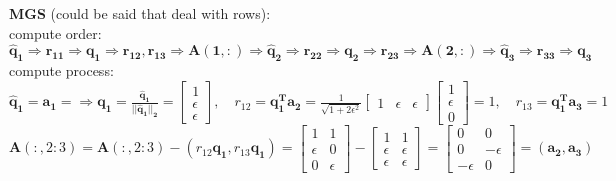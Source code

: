 \documentclass[english,onecolumn]{IEEEtran}
\begin{document}
\begin{enumerate}
    \textbf{MGS} (could be said that deal with rows):\\
    compute order:$\mathbf{ \hat{q}_1 \Rightarrow r_{11} \Rightarrow q_1 \Rightarrow r_{12},r_{13} \Rightarrow A(1,:) \Rightarrow \hat{q}_2 \Rightarrow r_{22} \Rightarrow q_2 \Rightarrow r_{23} \Rightarrow A(2,:) \Rightarrow \hat{q}_3  \Rightarrow r_{33} \Rightarrow q_3 }$\\
    compute process:\\
    $\mathbf{\hat{q}_1 = a_1} =  \Rightarrow
    \mathbf{q_1 = \frac{\hat{q}_1}{||\hat{q}_1||_2}} = 
    \begin{bmatrix}
    1 \\ \epsilon \\ \epsilon 
    \end{bmatrix}, \quad
    r_{12} = \mathbf{q_1^T a_2}  = \frac{1}{\sqrt{1+2 \epsilon^2}}
    \begin{bmatrix}
    1 & \epsilon & \epsilon 
    \end{bmatrix}
    \begin{bmatrix}
    1 \\ \epsilon \\ 0 
    \end{bmatrix} =  1 , \quad
    r_{13} = \mathbf{q_1^T  a_3}  = 1$\\
    $
    \mathbf{A}(:,2:3) = \mathbf{A}(:,2:3) - (r_{12} \mathbf{q_1}, r_{13} \mathbf{q_1}) = 
    \begin{bmatrix}
    1 & 1 \\ \epsilon & 0 \\ 0 & \epsilon 
    \end{bmatrix} - 
    \begin{bmatrix}
    1 & 1 \\ 
    \epsilon & \epsilon \\ 
    \epsilon & \epsilon
    \end{bmatrix} = 
    \begin{bmatrix}
    0 & 0 \\ 
    0 & -\epsilon \\ 
    -\epsilon & 0
    \end{bmatrix} = (\mathbf{a_2, a_3})
    $\\
    

\end{enumerate}
\end{document}

